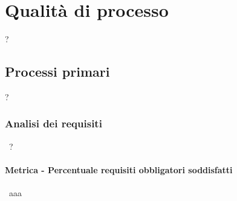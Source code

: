\section{Qualità di processo}
?
\subsection{Processi primari}
?

\subsubsection{Analisi dei requisiti} \ 
?
\paragraph{Metrica - Percentuale requisiti obbligatori soddisfatti} \
aaa
